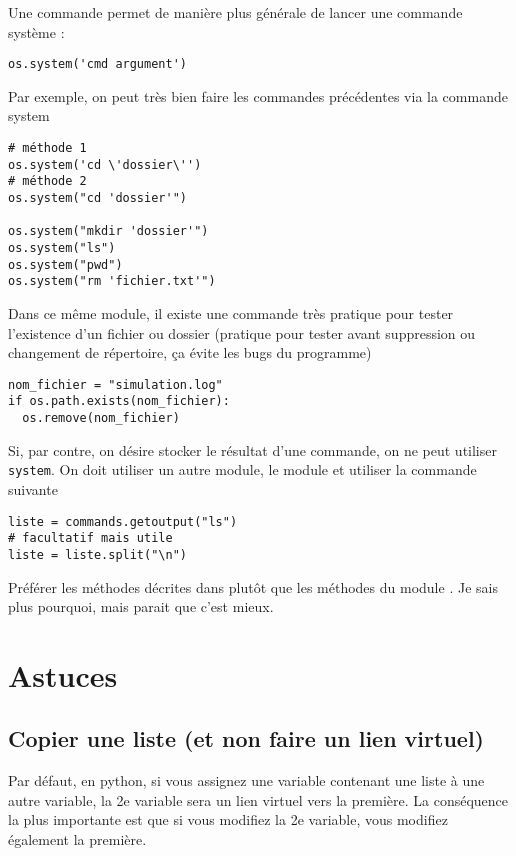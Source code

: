 \documentclass[a4paper,twoside]{article}
\begin{document}
Une commande permet de manière plus générale de lancer une commande système :
\begin{verbatim}
os.system('cmd argument')
\end{verbatim}

Par exemple, on peut très bien faire les commandes précédentes via la commande system
\begin{verbatim}
# méthode 1
os.system('cd \'dossier\'')
# méthode 2
os.system("cd 'dossier'")

os.system("mkdir 'dossier'")
os.system("ls")
os.system("pwd")
os.system("rm 'fichier.txt'")
\end{verbatim}

Dans ce même module, il existe une commande très pratique pour tester l'existence d'un fichier ou dossier (pratique pour tester avant suppression ou changement de répertoire, ça évite les bugs du programme)
\begin{verbatim}
nom_fichier = "simulation.log"
if os.path.exists(nom_fichier):
  os.remove(nom_fichier)
\end{verbatim}


Si, par contre, on désire stocker le résultat d'une commande, on ne peut utiliser \texttt{system}. On doit utiliser un autre module, le module  et utiliser la commande suivante
\begin{verbatim}
liste = commands.getoutput("ls")
# facultatif mais utile
liste = liste.split("\n")
\end{verbatim}

\begin{attention}
Préférer les méthodes décrites dans  plutôt que les méthodes du module . Je sais plus pourquoi, mais parait que c'est mieux.
\end{attention}


\section{Astuces}
\subsection{Copier une liste (et non faire un lien virtuel)}
Par défaut, en python, si vous assignez une variable contenant une liste à une autre variable, la 2e variable sera un lien virtuel vers la première. La conséquence la plus importante est que si vous modifiez la 2e variable, vous modifiez également la première.
\end{document}
